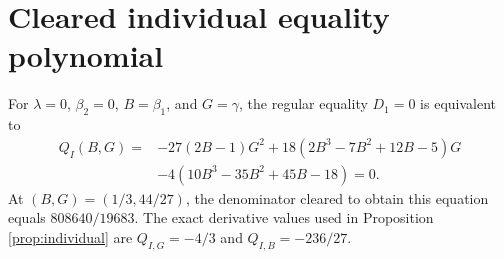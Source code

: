 \section{Cleared individual equality polynomial}
For $\lambda=0$, $\beta_2=0$, $B=\beta_1$, and $G=\gamma$, the regular equality $D_1=0$ is equivalent to
\begin{align*}
Q_I(B,G)=&-27(2B-1)G^2
 +18(2B^3-7B^2+12B-5)G\\
&-4(10B^3-35B^2+45B-18)=0.
\end{align*}
At $(B,G)=(1/3,44/27)$, the denominator cleared to obtain this equation equals $808640/19683$. The exact derivative values used in Proposition \ref{prop:individual} are $Q_{I,G}=-4/3$ and $Q_{I,B}=-236/27$.
